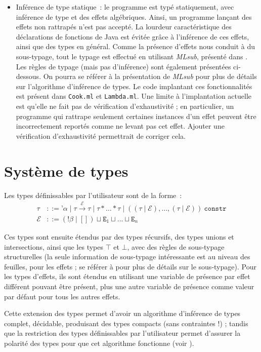 \documentclass[a4paper,10pt]{article}
\begin{document}
\begin{itemize}
\item{Inférence de type statique~: le programme est typé statiquement, avec inférence de type et des effets algébriques. Ainsi, un programme lançant des effets non rattrapés n'est pas accepté. La lourdeur caractéristique des déclarations de fonctions de Java est évitée grâce à l'inférence de ces effets, ainsi que des types en général. Comme la présence d'effets nous conduit à du sous-typage, tout le typage est effectué en utilisant \emph{MLsub}, présenté dans \cite{dolan2017algebraic}. Les règles de typage (mais pas d'inférence) sont également présentées ci-dessous. On pourra se référer à la présentation de \emph{MLsub} pour plus de détails sur l'algorithme d'inférence de types. Le code implantant ces fonctionnalités est présent dans \texttt{Cook.ml} et \texttt{Lambda.ml}. Une limite à l'implantation actuelle est qu'elle ne fait pas de vérification d'exhaustivité ; en particulier, un programme qui rattrape seulement certaines instances d'un effet peuvent être incorrectement reportés comme ne levant pas cet effet. Ajouter une vérification d'exhaustivité permettrait de corriger cela.}
\end{itemize}

\section{Système de types}

Les types définissables par l'utilisateur sont de la forme~:
\begin{align*}
  \tau &::= \texttt{'}\alpha \mid \tau \xrightarrow{\mathcal{E}} \tau \mid \tau * \dots * \tau \mid ((\tau \mid \mathcal{E}), \dots, (\tau \mid \mathcal{E}))~\texttt{constr} \\
  \mathcal{E} &::= (\texttt{!}\beta \mid []) \sqcup \texttt{E}_1 \sqcup \dots \sqcup \texttt{E}_n
\end{align*}

Ces types sont ensuite étendus par des types récursifs, des types unions et intersections, ainsi que les types $\top$ et $\bot$, avec des règles de sous-typage structurelles (la seule information de sous-typage intéressante est au niveau des feuilles, pour les effets ; se référer à \cite{dolan2017algebraic} pour plus de détails sur le sous-typage). Pour les types d'effets, ils sont étendus en utilisant une variable de présence par effet différent pouvant être présent, plus une autre variable de présence comme valeur par défaut pour tous les autres effets.

Cette extension des types permet d'avoir un algorithme d'inférence de types complet, décidable, produisant des types compacts (sans contraintes !) ; tandis que la restriction des types définissables par l'utilisateur permet d'assurer la polarité des types pour que cet algorithme fonctionne (voir \cite{dolan2017algebraic}).
\end{document}
